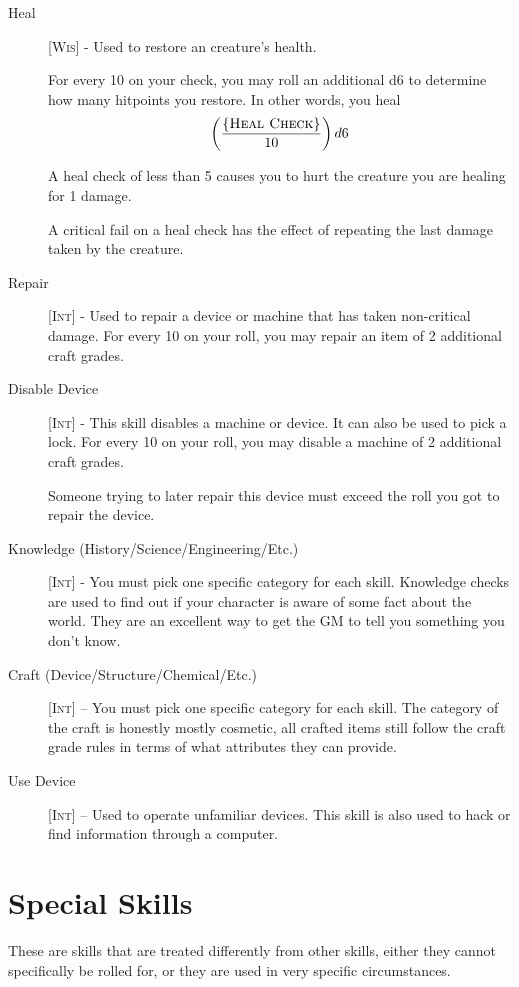 \begin{description}
\item[Heal] [\textsc{Wis}] - Used to restore an creature's health.

For every 10 on your check, you may roll an additional d6 to determine how many hitpoints you restore. In other words, you heal $$\left( \frac{\{ \textsc{Heal Check} \}}{10} \right) d6$$

A heal check of less than 5 causes you to hurt the creature you are healing for 1 damage.

A critical fail on a heal check has the effect of repeating the last damage taken by the creature.

\item[Repair] [\textsc{Int}] - Used to repair a device or machine that has taken non-critical damage. For every 10 on your roll, you may repair an item of 2 additional craft grades.

\item[Disable Device] [\textsc{Int}] - This skill disables a machine or device. It can also be used to pick a lock. For every 10 on your roll, you may disable a machine of 2 additional craft grades.

Someone trying to later repair this device must exceed the roll you got to repair the device.

\item[Knowledge (History/Science/Engineering/Etc.)] [\textsc{Int}] - You must pick one specific category for each skill. Knowledge checks are used to find out if your character is aware of some fact about the world. They are an excellent way to get the GM to tell you something you don’t know.

\item[Craft (Device/Structure/Chemical/Etc.)] [\textsc{Int}] – You must pick one specific category for each skill. The category of the craft is honestly mostly cosmetic, all crafted items still follow the craft grade rules in terms of what attributes they can provide.

\item[Use Device] [\textsc{Int}] – Used to operate unfamiliar devices. This skill is also used to hack or find information through a computer.
\end{description}

\section{Special Skills}
These are skills that are treated differently from other skills, either they cannot specifically be rolled for, or they are used in very specific circumstances.

